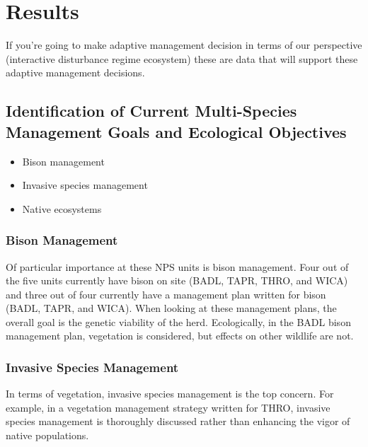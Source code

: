 \hypertarget{results}{%
	\section{Results}\label{results}}

If you're going to make adaptive management decision in terms of our perspective (interactive disturbance regime ecosystem) these are data that will support these adaptive management decisions.

\hypertarget{identification-of-current-multi-species-management-goals-and-ecological-objectives}{%
	\subsection{Identification of Current Multi-Species Management Goals and Ecological Objectives} \label{identification-of-current-multi-species-management-goals-and-ecological-objectives}}

\begin{itemize}
	\item Bison management
	\item Invasive species management
	\item Native ecosystems
\end{itemize}

\hypertarget{bison-management}{%
	\subsubsection{Bison Management}\label{bison-management}} 

Of particular importance at these NPS units is bison management. 
Four out of the five units currently have bison on site (BADL, TAPR, THRO, and WICA) and three out of four currently have a management plan written for bison (BADL, TAPR, and WICA). 
When looking at these management plans, the overall goal is the genetic viability of the herd.
Ecologically, in the BADL bison management plan, vegetation is considered, but effects on other wildlife are not.

\hypertarget{invasive-species-management}{%
\subsubsection{Invasive Species Management} \label{invasive-species-management}}

In terms of vegetation, invasive species management is the top concern.
For example, in a vegetation management strategy written for THRO, invasive species management is thoroughly discussed rather than enhancing the vigor of native populations.

